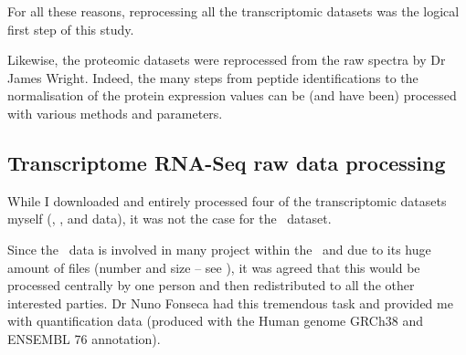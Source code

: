 For all these reasons, reprocessing all the transcriptomic datasets was the
logical first step of this study.

Likewise, the proteomic datasets were reprocessed from the raw spectra by Dr
James Wright. Indeed, the many steps from peptide identifications to the
normalisation of the protein expression values can be (and have been) processed
with various methods and parameters.


\subsection{Transcriptome RNA-Seq raw data processing}

While I downloaded and entirely processed four of the transcriptomic datasets
myself (, ,  and 
data), it was not the case for the \Gtex\ dataset.

Since the \Gtex\ data is involved in many project within the \EBI\
and due to its huge amount of files (number and  size -- see ),
it was agreed that this would be processed centrally by one person and then
redistributed to all the other interested parties. Dr Nuno Fonseca had this
tremendous task and provided me with quantification data (produced with the
Human genome GRCh38 and ENSEMBL 76 annotation).

